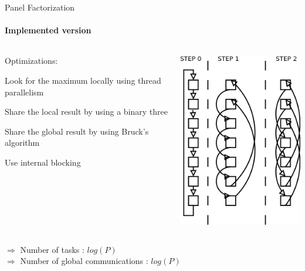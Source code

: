 \begin{frame}{Panel Factorization}
\framesubtitle{Implemented version}
\begin{columns}
\begin{column}{.50\textwidth}
Optimizations:
\begin{itemize}
{
\item Look for the maximum locally using thread parallelism
\item Share the local result by using a binary three}
\item Share the global result by using Bruck's algorithm
\item Use internal blocking
\end{itemize}
\end{column}
\hfill
\begin{column}{.50\textwidth}
\begin{center}
\includegraphics[scale=0.5]{bruck.png}
\end{center}
\end{column}
\end{columns}
\pause
\begin{exampleblock}{}
$\Longrightarrow$ Number of tasks : $log(P)$\\
$\Longrightarrow$ Number of global communications : $log(P)$
\end{exampleblock}{}
\end{frame}

